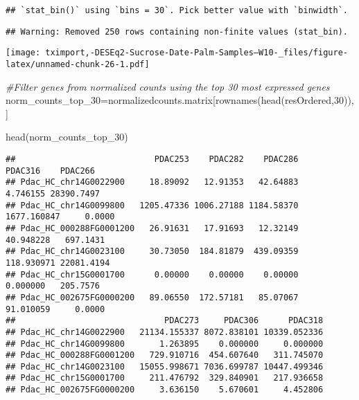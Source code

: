 \documentclass[
]{article}
\newenvironment{Shaded}{\begin{snugshade}}{\end{snugshade}}
\newcommand{\CommentTok}[1]{\textcolor[rgb]{0.56,0.35,0.01}{\textit{#1}}}
\newcommand{\DecValTok}[1]{\textcolor[rgb]{0.00,0.00,0.81}{#1}}
\newcommand{\FunctionTok}[1]{\textcolor[rgb]{0.00,0.00,0.00}{#1}}
\newcommand{\NormalTok}[1]{#1}
\newcommand{\OtherTok}[1]{\textcolor[rgb]{0.56,0.35,0.01}{#1}}
\begin{document}
\begin{verbatim}
## `stat_bin()` using `bins = 30`. Pick better value with `binwidth`.
\end{verbatim}

\begin{verbatim}
## Warning: Removed 250 rows containing non-finite values (stat_bin).
\end{verbatim}

\texttt{[image: tximport,-DESEq2-Sucrose-Date-Palm-Samples--W10-\_files/figure-latex/unnamed-chunk-26-1.pdf]}

\begin{Shaded}
\begin{Highlighting}[]
\CommentTok{\#Filter genes from normalized counts using the top 30 most expressed genes}
\NormalTok{norm\_counts\_top\_30}\OtherTok{=}\NormalTok{normalizedcounts.matrix[}\FunctionTok{rownames}\NormalTok{(}\FunctionTok{head}\NormalTok{(resOrdered,}\DecValTok{30}\NormalTok{)), ]}
\end{Highlighting}
\end{Shaded}

\begin{Shaded}
\begin{Highlighting}[]
\FunctionTok{head}\NormalTok{(norm\_counts\_top\_30)}
\end{Highlighting}
\end{Shaded}

\begin{verbatim}
##                            PDAC253    PDAC282    PDAC286     PDAC316    PDAC266
## Pdac_HC_chr14G0022900     18.89092   12.91353   42.64883    4.746155 28390.7497
## Pdac_HC_chr14G0099800   1205.47336 1006.27188 1184.58370 1677.160847     0.0000
## Pdac_HC_000288FG0001200   26.91631   17.91693   12.32149   40.948228   697.1431
## Pdac_HC_chr14G0023100     30.73050  184.81879  439.09359  118.930971 22081.4194
## Pdac_HC_chr15G0001700      0.00000    0.00000    0.00000    0.000000   205.7576
## Pdac_HC_002675FG0000200   89.06550  172.57181   85.07067   91.010059     0.0000
##                              PDAC273     PDAC306      PDAC318
## Pdac_HC_chr14G0022900   21134.155337 8072.838101 10339.052336
## Pdac_HC_chr14G0099800       1.263895    0.000000     0.000000
## Pdac_HC_000288FG0001200   729.910716  454.607640   311.745070
## Pdac_HC_chr14G0023100   15055.998671 7036.699787 10447.499346
## Pdac_HC_chr15G0001700     211.476792  329.840901   217.936658
## Pdac_HC_002675FG0000200     3.636150    5.670601     4.452806
\end{verbatim}
\end{document}
